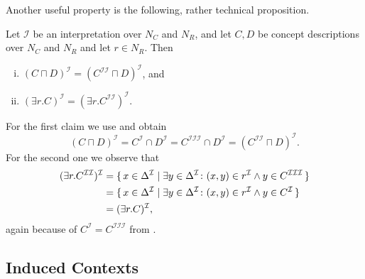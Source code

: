 Another useful property is the following, rather technical proposition.

\begin{Proposition}
  \label{prop:double-II-under-I}
  Let $\mathcal{I}$ be an interpretation over $N_C$ and $N_R$, and let $C, D$ be \ELgfpbot
  concept descriptions over $N_C$ and $N_R$ and let $r \in N_R$.  Then
  \begin{enumerate}[i. ]
  \item $(C \sqcap D)^{\mathcal{I}} = (C^{\mathcal{I}\mathcal{I}} \sqcap
    D)^{\mathcal{I}}$, and
  \item $(\exists r. C)^{\mathcal{I}} = (\exists r. C^{\mathcal{I}\mathcal{I}})^{\mathcal{I}}$.
  \end{enumerate}
\end{Proposition}
\begin{Proof}
  For the first claim we use  and obtain
  \begin{equation*}
    (C \sqcap D)^{\mathcal{I}} = C^{\mathcal{I}} \cap D^{\mathcal{I}} =
    C^{\mathcal{I}\mathcal{I}\mathcal{I}} \cap D^{\mathcal{I}} =
    (C^{\mathcal{I}\mathcal{I}} \sqcap D)^{\mathcal{I}}.
  \end{equation*}
  For the second one we observe that
  \begin{align*}
    (\exists r. C^{\mathcal{I}\mathcal{I}})^{\mathcal{I}}
    &= {\{\, x \in \Delta^{\mathcal{I}} \mid \exists y \in \Delta^{\mathcal{I}} \colon (x, y)
      \in r^{\mathcal{I}} \wedge y \in C^{\mathcal{I}\mathcal{I}\mathcal{I}} \,\}}\\
    &= {\{\, x \in \Delta^{\mathcal{I}} \mid \exists y \in \Delta^{\mathcal{I}} \colon (x, y)
      \in r^{\mathcal{I}} \wedge y \in C^{\mathcal{I}} \,\}} \\
    &= (\exists r. C)^{\mathcal{I}},
  \end{align*}
  again because of $C^{\mathcal{I}} = C^{\mathcal{I}\mathcal{I}\mathcal{I}}$ from
  .
\end{Proof}


\subsection{Induced Contexts}
\label{sec:induced-contexts}

%
%
%


